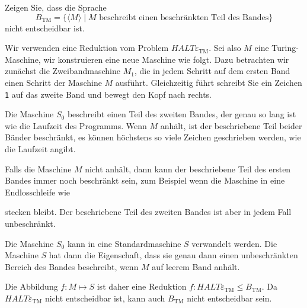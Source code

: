 Zeigen Sie, dass die Sprache
\[
B_{\text{TM}}
=
\{
\langle M\rangle
\mid
\text{$M$ beschreibt einen beschränkten Teil des Bandes}
\}
\]
nicht entscheidbar ist.


\begin{loesung}
Wir verwenden eine Reduktion vom Problem
$\textit{HALT}\varepsilon_{\text{TM}}$.
Sei also $M$ eine Turing-Maschine, wir konstruieren eine neue Maschine
wie folgt.
Dazu betrachten wir zunächst die Zweibandmaschine $M_1$, die in jedem 
Schritt auf dem ersten Band einen Schritt der Maschine $M$ ausführt.
Gleichzeitig führt schreibt Sie ein Zeichen \texttt{1} auf das zweite
Band und bewegt den Kopf nach rechts.

Die Maschine $S_0$ beschreibt einen Teil des zweiten Bandes, der
genau so lang ist wie die Laufzeit des Programms.
Wenn $M$ anhält, ist der beschriebene Teil beider Bänder beschränkt,
es können höchstens so viele Zeichen geschrieben werden, wie die Laufzeit
angibt.

Falls die Maschine $M$ nicht anhält, dann kann der beschriebene
Teil des ersten Bandes immer noch beschränkt sein, zum Beispiel
wenn die Maschine in eine Endlosschleife wie
\begin{center}
\def\h{0.4}
\def\zustand#1#2{
	\fill[color=white] #1 circle[radius=\h];
	\draw #1 circle[radius=\h];
	\node at #1 {$#2\mathstrut$};
}
\end{center}
stecken bleibt.
Der beschriebene Teil des zweiten Bandes ist aber in jedem Fall unbeschränkt.

Die Maschine $S_0$ kann in eine Standardmaschine $S$ verwandelt werden.
Die Maschine $S$ hat dann die Eigenschaft, dass sie genau dann einen
unbeschränkten Bereich des Bandes beschreibt, wenn $M$ auf leerem
Band anhält.

Die Abbildung $f\colon M\mapsto S$ ist daher eine Reduktion
$f \colon \textit{HALT}\varepsilon_{\text{TM}}\le B_{\text{TM}}$.
Da $\textit{HALT}\varepsilon_{\text{TM}}$ nicht entscheidbar ist,
kann auch $B_{\text{TM}}$ nicht entscheidbar sein.
\end{loesung}
